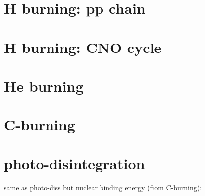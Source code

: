 \documentclass[main.tex]{subfiles}
\begin{document}
\section{H burning: pp chain}

\section{H burning: CNO cycle}

\section{He burning}

\section{C-burning}

\section{photo-disintegration}
same as photo-diss but nuclear binding energy (from C-burning): 
\end{document}
